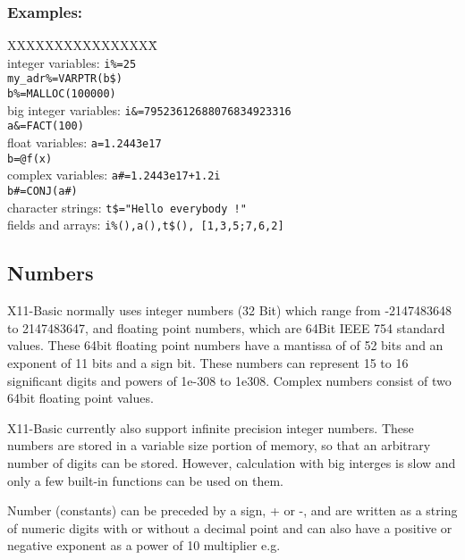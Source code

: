 \subsubsection*{Examples:}

\begin{tabbing}
XXXXXXXXXXXXXXXX\=\kill\\
integer variables: \>   \verb|i%=25| \\
		\>	\verb|my_adr%=VARPTR(b$)| \\
		\>	\verb|b%=MALLOC(100000)| \\
big integer variables: \>   \verb|i&=79523612688076834923316| \\
		\>	\verb|a&=FACT(100)| \\
float variables:  \>    \verb|a=1.2443e17| \\
		\>    \verb|b=@f(x)| \\
complex variables:  \>  \verb|a#=1.2443e17+1.2i| \\
		\>    \verb|b#=CONJ(a#)| \\
		
character strings:\>    \verb|t$="Hello everybody !"| \\
fields and arrays:\>    \verb|i%(),a(),t$(), [1,3,5;7,6,2]| \\
 \end{tabbing}

\subsection{Numbers}

X11-Basic normally uses integer numbers (32 Bit) which range from -2147483648 to
2147483647, and floating point numbers, which  are 64Bit IEEE 754 standard
values. These 64bit floating point numbers have a  mantissa of of 52 bits and an
exponent of 11 bits and a sign bit. These numbers can represent 15 to 16
significant digits and powers of 1e-308 to 1e308. Complex numbers consist of two
64bit floating point values. 

X11-Basic currently also support infinite precision integer numbers. These
numbers are stored in a variable size portion of memory, so that an arbitrary
number of digits can be stored. However, calculation with big interges is slow
and only a  few built-in functions can be used on them.

Number (constants) can be preceded by a sign, + or -, and are written as a
string of numeric digits with or without a decimal point and can also have a
positive or negative exponent as a power of 10 multiplier e.g. 

